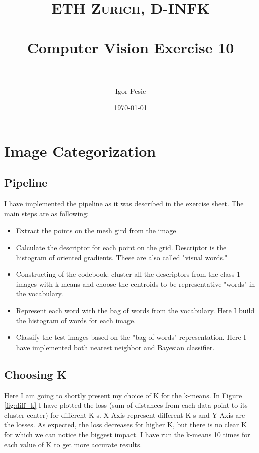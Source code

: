 \documentclass[paper=a4, fontsize=11pt]{scrartcl} %
\title{	
\normalfont \normalsize 
\textsc{ETH Zurich, D-INFK} \\ [25pt] %
\horrule{0.5pt} \\[0.4cm] %
\huge Computer Vision Exercise 10 \\ %
\horrule{2pt} \\[0.5cm] %
}
\author{Igor Pesic} %
\date{\normalsize\today} %
\numberwithin{equation}{section} %
\numberwithin{figure}{section} %
\numberwithin{table}{section} %
\begin{document}
\maketitle %


\section{Image Categorization}

\subsection{Pipeline}

I have implemented the pipeline as it was described in the exercise sheet. The main steps are as following:
\begin{itemize}
\item Extract the points on the mesh gird from the image
\item Calculate the descriptor for each point on the grid. Descriptor is the histogram of oriented gradients. These are also called "visual words."
\item Constructing of the codebook: cluster all the descriptors from the class-1 images with k-means and choose the centroids to be representative "words" in the vocabulary.
\item Represent each word with the bag of words from the vocabulary. Here I build the histogram of words for each image.
\item Classify the test images based on the "bag-of-words" representation. Here I have implemented both nearest neighbor and Bayesian classifier.
\end{itemize}

\subsection{Choosing K}

Here I am going to shortly present my choice of K for the k-means. In Figure \ref{fig:diff_k} I have plotted the loss (sum of distances from each data point to its cluster center) for different K-s. X-Axis represent different K-s and Y-Axis are the losses. As expected, the loss decreases for higher K, but there is no clear K for which we can notice the biggest impact. I have run the k-means 10 times for each value of K to get more accurate results.\\
\end{document}
